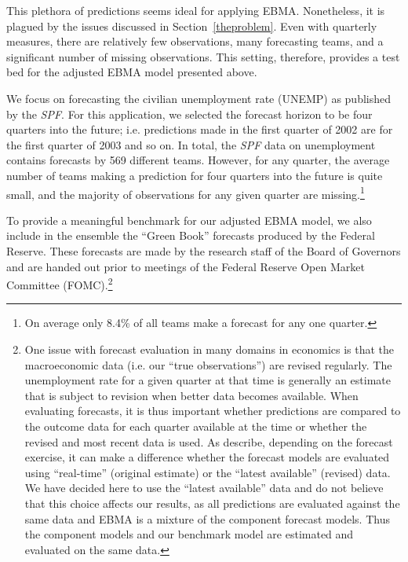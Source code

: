 \documentclass[12pt,fullpage,endnotes]{article}
\begin{document}
This plethora of predictions seems ideal for applying EBMA.
Nonetheless, it is plagued by the issues discussed in
Section~\ref{theproblem}.  Even with quarterly measures, there are
relatively few observations, many forecasting teams, and a significant
number of missing observations.  This setting, therefore, provides a
test bed for the adjusted EBMA model presented above.

We focus on forecasting the civilian unemployment rate (UNEMP) as
published by the \textit{SPF}. For this application, we selected the
forecast horizon to be four quarters into the future; i.e. predictions
made in the first quarter of 2002 are for the first quarter of 2003
and so on. In total, the \textit{SPF} data on unemployment contains
forecasts by 569 different teams. However, for any quarter, the
average number of teams making a prediction for four quarters into the
future is quite small, and the majority of observations for any given
quarter are missing.\footnote{On average only 8.4\% of all
  teams make a forecast for any one quarter.}

To provide a meaningful benchmark for our adjusted EBMA model, we also
include in the ensemble the ``Green Book'' forecasts produced by the
Federal Reserve. These forecasts are made by the research staff of the
Board of Governors and are handed out prior to meetings of the Federal
Reserve Open Market Committee (FOMC).\footnote{One issue with forecast
  evaluation in many domains in economics is that the macroeconomic
  data (i.e. our ``true observations'') are revised regularly. The
  unemployment rate for a given quarter at that time is generally an
  estimate that is subject to revision when better data becomes
  available. When evaluating forecasts, it is thus important whether
  predictions are compared to the outcome data for each quarter
  available at the time or whether the revised and most recent data is
  used. As \citet{Croushore:Stark:2001} describe, depending on the
  forecast exercise, it can make a difference whether the forecast
  models are evaluated using ``real-time'' (original estimate) or the
  ``latest available'' (revised) data. We have decided here to use the
  ``latest available'' data and do not believe that this choice
  affects our results, as all predictions are evaluated against the
  same data and EBMA is a mixture of the component forecast
  models. Thus the component models and our benchmark model are
  estimated and evaluated on the same
  data.} %
\end{document}

